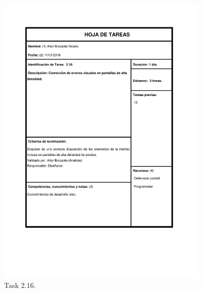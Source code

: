 \documentclass{DeustoFDP}
\begin{document}
\begin{figure}[H]
	\centering
	\includegraphics[width=0.9\textwidth]{fig/Tareas/216}
	\caption{Task 2.16.}
	\label{fig:t216}
\end{figure}
\end{document}
